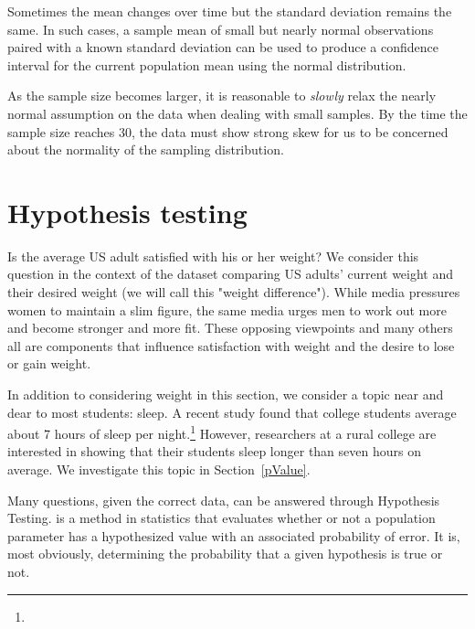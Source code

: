 Sometimes the mean changes over time but the standard deviation remains the same. In such cases, a sample mean of small but nearly normal observations paired with a known standard deviation can be used to produce a confidence interval for the current population mean using the normal distribution.

\begin{tipBox}{
As the sample size becomes larger, it is reasonable to \emph{slowly} relax the nearly normal assumption on the data when dealing with small samples. By the time the sample size reaches 30, the data must show strong skew for us to be concerned about the normality of the sampling distribution.}
\end{tipBox}

\section{Hypothesis testing}
\label{hypothesisTesting}


Is the average US adult satisfied with his or her weight? We consider this question in the context of the  dataset comparing US adults' current weight and their desired weight (we will call this "weight difference"). While media pressures women to maintain a slim figure, the same media urges men to work out more and become stronger and more fit. These opposing viewpoints and many others all are components that influence satisfaction with weight and the desire to lose or gain weight. 

In addition to considering weight in this section, we consider a topic near and dear to most students: sleep. A recent study found that college students average about 7 hours of sleep per night.\footnote{} However, researchers at a rural college are interested in showing that their students sleep longer than seven hours on average. We investigate this topic in Section~\ref{pValue}.

Many questions, given the correct data, can be answered through Hypothesis Testing.  is a method in statistics that evaluates whether or not a population parameter has a hypothesized value with an associated probability of error. It is, most obviously, determining the probability that a given hypothesis is true or not.

